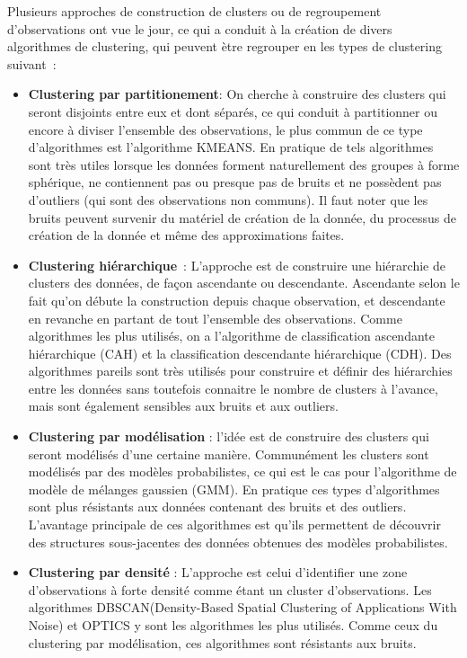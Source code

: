 \documentclass[12pt, french, latin.medieval, a4paper]{report}
\begin{document}
    Plusieurs approches de construction de clusters ou de regroupement d’observations ont vue le jour, ce qui a conduit à la création de divers algorithmes de clustering, qui peuvent ètre regrouper en les types de clustering suivant :

    \begin{itemize}
        \item \textbf{Clustering par partitionement}: On cherche à construire des clusters qui seront disjoints entre eux et dont séparés, ce qui conduit à partitionner ou encore à diviser l’ensemble des observations, le plus commun de ce type d’algorithmes est l’algorithme KMEANS.  En pratique de tels algorithmes sont très utiles lorsque les données forment naturellement des groupes à forme sphérique, ne contiennent pas ou presque pas de bruits et ne possèdent pas d’outliers (qui sont des observations non communs). Il faut noter que les bruits peuvent survenir du matériel de création de la donnée, du processus de création de la donnée et même des approximations faites.
        
        \item \textbf{Clustering hiérarchique} : L’approche est de construire une hiérarchie de clusters des données, de façon ascendante ou descendante. Ascendante selon le fait qu’on débute la construction depuis chaque observation, et descendante en revanche en partant de tout l’ensemble des observations. Comme algorithmes les plus utilisés, on a l’algorithme de classification ascendante hiérarchique (CAH) et la classification descendante hiérarchique (CDH). Des algorithmes pareils sont très utilisés pour construire et définir des hiérarchies entre les données sans toutefois connaitre le nombre de clusters à l’avance, mais sont également sensibles aux bruits et aux outliers.

        \item \textbf{Clustering par modélisation} : l’idée est de construire des clusters qui seront modélisés d’une certaine manière. Communément les clusters sont modélisés par des modèles probabilistes, ce qui est le cas pour l’algorithme de modèle de mélanges gaussien (GMM). En pratique ces types d’algorithmes sont plus résistants aux données contenant des bruits et des outliers. L’avantage principale de ces algorithmes est qu’ils permettent de découvrir des structures sous-jacentes des données obtenues des modèles probabilistes.

        \item \textbf{Clustering par densité} : L’approche est celui d’identifier une zone d’observations à forte densité comme étant un cluster d’observations. Les algorithmes DBSCAN(Density-Based Spatial Clustering of Applications With Noise) et OPTICS y sont les algorithmes les plus utilisés. Comme ceux du clustering par modélisation, ces algorithmes sont résistants aux bruits.
        
    \end{itemize}
\end{document}
